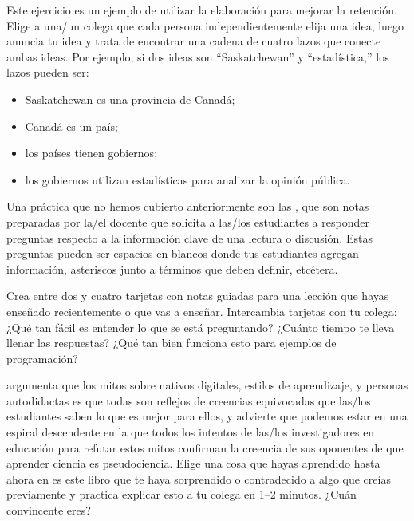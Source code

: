 
Este ejercicio es un ejemplo de utilizar la elaboración para mejorar la retención.
Elige a una/un colega
que cada persona independientemente elija una idea,
luego anuncia tu idea y trata de encontrar una cadena de cuatro lazos
que conecte ambas ideas.
Por ejemplo,
si dos ideas son ``Saskatchewan'' y ``estadística,''
los lazos pueden ser:

\begin{itemize}

\item
  Saskatchewan es una provincia de Canadá;

\item
  Canadá es un país;

\item
 los países tienen gobiernos;

\item
  los gobiernos utilizan estadísticas para analizar la opinión pública.

\end{itemize}


Una práctica que no hemos cubierto anteriormente son las ,
que son notas preparadas por la/el docente
que solicita a las/los estudiantes a responder preguntas respecto a la información clave de una lectura o discusión.
Estas preguntas pueden ser espacios en blancos donde tus estudiantes agregan información,
asteriscos junto a términos que deben definir,
etcétera.

Crea entre dos y cuatro tarjetas con notas guiadas para una lección que hayas enseñado recientemente
o que vas a enseñar.
Intercambia tarjetas con tu colega:
¿Qué tan fácil es entender lo que se está preguntando?
¿Cuánto tiempo te lleva llenar las respuestas?
¿Qué tan bien funciona esto para ejemplos de programación?


\cite{Kirs2013} argumenta que los mitos sobre nativos digitales,
estilos de aprendizaje,
y personas autodidactas es que todas son reflejos de creencias equivocadas que
las/los estudiantes saben lo que es mejor para ellos,
y advierte que podemos estar en una espiral descendente
en la que todos los intentos de las/los investigadores en educación para refutar estos mitos
confirman la creencia de sus oponentes de que aprender ciencia es pseudociencia.
Elige una cosa que hayas aprendido hasta ahora en es este libro
que te haya sorprendido o contradecido a algo que creías previamente
y practica explicar esto a tu colega en 1--2 minutos.
¿Cuán convincente eres?

